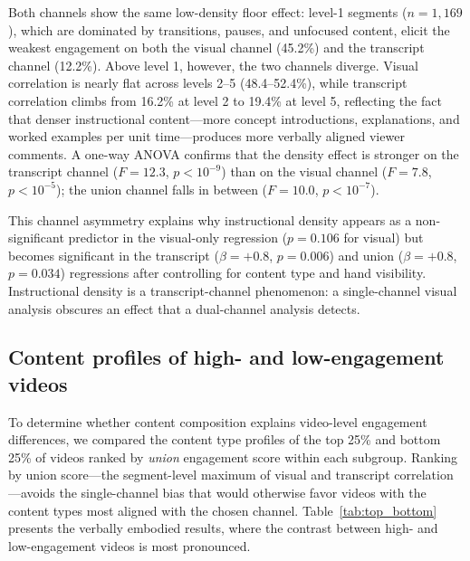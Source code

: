 \documentclass[fleqn,10pt]{wlscirep}
\begin{document}
Both channels show the same low-density floor effect: level-1 segments ($n = 1{,}169$), which are dominated by transitions, pauses, and unfocused content, elicit the weakest engagement on both the visual channel (45.2\%) and the transcript channel (12.2\%). Above level 1, however, the two channels diverge. Visual correlation is nearly flat across levels 2--5 (48.4--52.4\%), while transcript correlation climbs from 16.2\% at level 2 to 19.4\% at level 5, reflecting the fact that denser instructional content---more concept introductions, explanations, and worked examples per unit time---produces more verbally aligned viewer comments. A one-way ANOVA confirms that the density effect is stronger on the transcript channel ($F = 12.3$, $p < 10^{-9}$) than on the visual channel ($F = 7.8$, $p < 10^{-5}$); the union channel falls in between ($F = 10.0$, $p < 10^{-7}$).

This channel asymmetry explains why instructional density appears as a non-significant predictor in the visual-only regression ($p = 0.106$ for visual) but becomes significant in the transcript ($\beta = +0.8$, $p = 0.006$) and union ($\beta = +0.8$, $p = 0.034$) regressions after controlling for content type and hand visibility. Instructional density is a transcript-channel phenomenon: a single-channel visual analysis obscures an effect that a dual-channel analysis detects.


\subsection*{Content profiles of high- and low-engagement videos}

To determine whether content composition explains video-level engagement differences, we compared the content type profiles of the top 25\% and bottom 25\% of videos ranked by \emph{union} engagement score within each subgroup. Ranking by union score---the segment-level maximum of visual and transcript correlation---avoids the single-channel bias that would otherwise favor videos with the content types most aligned with the chosen channel. Table~\ref{tab:top_bottom} presents the verbally embodied results, where the contrast between high- and low-engagement videos is most pronounced.
\end{document}
